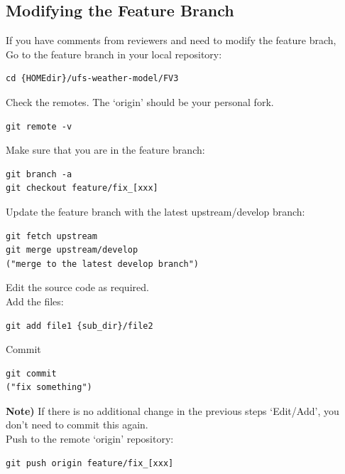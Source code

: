 \documentclass[11pt,fleqn]{report}              %
\begin{document}
\subsection{Modifying the Feature Branch}

If you have comments from reviewers and need to modify the feature brach, \\

Go to the feature branch in your local repository:
\lstset{language=bash}   
\begin{lstlisting}[frame=trBL]
cd {HOMEdir}/ufs-weather-model/FV3
\end{lstlisting}

Check the remotes. The `origin' should be your personal fork.
\lstset{language=bash}   
\begin{lstlisting}[frame=trBL]
git remote -v
\end{lstlisting}

Make sure that you are in the feature branch:
\lstset{language=bash}   
\begin{lstlisting}[frame=trBL]
git branch -a
git checkout feature/fix_[xxx]
\end{lstlisting}

Update the feature branch with the latest upstream/develop branch:
\lstset{language=bash}   
\begin{lstlisting}[frame=trBL]
git fetch upstream
git merge upstream/develop
("merge to the latest develop branch")
\end{lstlisting}

\vspace{0.2cm}
Edit the source code as required. \\

Add the files:
\lstset{language=bash}   
\begin{lstlisting}[frame=trBL]
git add file1 {sub_dir}/file2
\end{lstlisting}

\vspace{0.2cm}

Commit 
\lstset{language=bash}   
\begin{lstlisting}[frame=trBL]
git commit
("fix something")
\end{lstlisting}
{\bf Note)} If there is no additional change in the previous steps `Edit/Add', you don't need to commit this again. \\

Push to the remote `origin' repository:
\lstset{language=bash}   
\begin{lstlisting}[frame=trBL]
git push origin feature/fix_[xxx]
\end{lstlisting}
\end{document}
